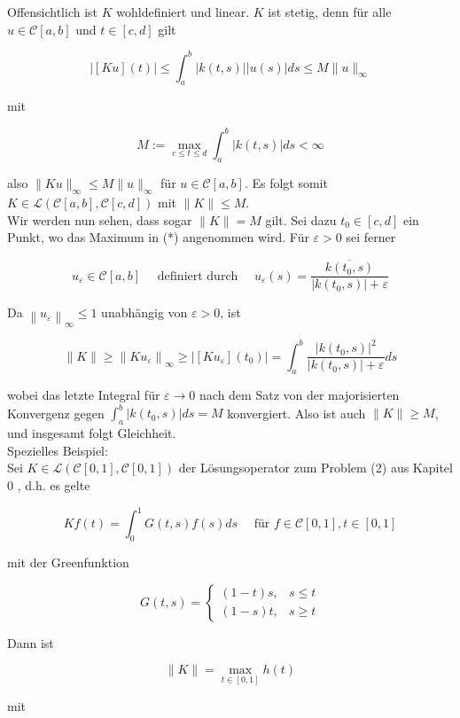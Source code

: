 \documentclass[10pt, letterpaper]{article}
\begin{document}
Offensichtlich ist $K$ wohldefiniert und linear. $K$ ist stetig, denn für alle $u \in \mathcal{C}[a, b]$ und $t \in[c, d]$ gilt

$$
|[K u](t)| \leq \int_{a}^{b}|k(t, s)||u(s)| d s \leq M\|u\|_{\infty}
$$

mit

$$
M:=\max _{c \leq t \leq d} \int_{a}^{b}|k(t, s)| d s<\infty
$$

also $\|K u\|_{\infty} \leq M\|u\|_{\infty}$ für $u \in \mathcal{C}[a, b]$. Es folgt somit $K \in \mathcal{L}(\mathcal{C}[a, b], \mathcal{C}[c, d])$ mit $\|K\| \leq M$.\\
Wir werden nun sehen, dass sogar $\|K\|=M$ gilt. Sei dazu $t_{0} \in[c, d]$ ein Punkt, wo das Maximum in (*) angenommen wird. Für $\varepsilon>0$ sei ferner

$$
u_{\varepsilon} \in \mathcal{C}[a, b] \quad \text { definiert durch } \quad u_{\varepsilon}(s)=\frac{\overline{k\left(t_{0}, s\right)}}{\left|k\left(t_{0}, s\right)\right|+\varepsilon}
$$

Da $\left\|u_{\varepsilon}\right\|_{\infty} \leq 1$ unabhängig von $\varepsilon>0$, ist

$$
\|K\| \geq\left\|K u_{\varepsilon}\right\|_{\infty} \geq\left|\left[K u_{\varepsilon}\right]\left(t_{0}\right)\right|=\int_{a}^{b} \frac{\left|k\left(t_{0}, s\right)\right|^{2}}{\left|k\left(t_{0}, s\right)\right|+\varepsilon} d s
$$

wobei das letzte Integral für $\varepsilon \rightarrow 0$ nach dem Satz von der majorisierten Konvergenz gegen $\int_{a}^{b}\left|k\left(t_{0}, s\right)\right| d s=M$ konvergiert. Also ist auch $\|K\| \geq M$, und insgesamt folgt Gleichheit.\\
Spezielles Beispiel:\\
Sei $K \in \mathcal{L}(\mathcal{C}[0,1], \mathcal{C}[0,1])$ der Lösungsoperator zum Problem (2) aus Kapitel 0 , d.h. es gelte

$$
K f(t)=\int_{0}^{1} G(t, s) f(s) d s \quad \text { für } f \in \mathcal{C}[0,1], t \in[0,1]
$$

mit der Greenfunktion

$$
G(t, s)= \begin{cases}(1-t) s, & s \leq t \\ (1-s) t, & s \geq t\end{cases}
$$

Dann ist

$$
\|K\|=\max _{t \in[0,1]} h(t)
$$

mit
\end{document}
